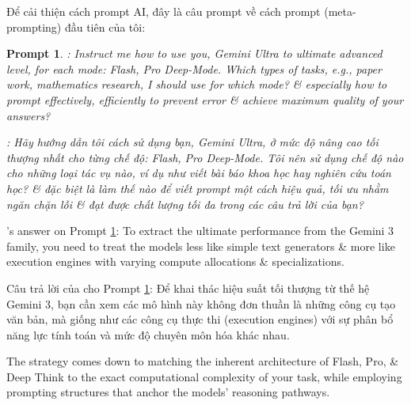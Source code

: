 \documentclass{article}
\newtheorem{prompt}{Prompt}
\begin{document}
Để cải thiện cách prompt AI, đây là câu prompt về cách prompt (meta-prompting) đầu tiên của tôi:
\begin{prompt}
	\label{promt: how to prompt Gemini}
	{\sf[NQBH, 29]:} Instruct me how to use you, Gemini Ultra to ultimate advanced level, for each mode: Flash, Pro Deep-Mode. Which types of tasks, e.g., paper work, mathematics research, I should use for which mode? \& especially how to prompt effectively, efficiently to prevent error \& achieve maximum quality of your answers?
	
	{\sf[NQBH, 29]:} Hãy hướng dẫn tôi cách sử dụng bạn, Gemini Ultra, ở mức độ nâng cao tối thượng nhất cho từng chế độ: Flash, Pro Deep-Mode. Tôi nên sử dụng chế độ nào cho những loại tác vụ nào, ví dụ như viết bài báo khoa học hay nghiên cứu toán học? \& đặc biệt là làm thế nào để viết prompt một cách hiệu quả, tối ưu nhằm ngăn chặn lỗi \& đạt được chất lượng tối đa trong các câu trả lời của bạn?
\end{prompt}
's answer on Prompt \ref{promt: how to prompt Gemini}: To extract the ultimate performance from the Gemini 3 family, you need to treat the models less like simple text generators \& more like execution engines with varying compute allocations \& specializations.

\noindent Câu trả lời của {} cho Prompt \ref{promt: how to prompt Gemini}: Để khai thác hiệu suất tối thượng từ thế hệ Gemini 3, bạn cần xem các mô hình này không đơn thuần là những công cụ tạo văn bản, mà giống như các công cụ thực thi (execution engines) với sự phân bổ năng lực tính toán và mức độ chuyên môn hóa khác nhau.

The strategy comes down to matching the inherent architecture of {\sf Flash, Pro}, \& {\sf Deep Think} to the exact computational complexity of your task, while employing prompting structures that anchor the models' reasoning pathways.
\end{document}
